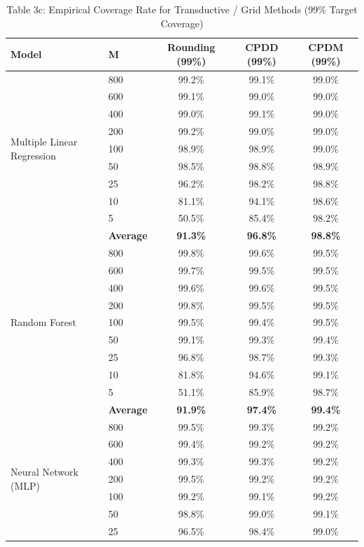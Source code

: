 \documentclass[11pt,a4paper]{article}
\begin{document}
\begin{table}[H]
\centering
\caption{Table 3c: Empirical Coverage Rate for Transductive / Grid Methods (99\% Target Coverage)}
\label{tab:3c}
\scriptsize
\begin{tabular}{llccc}
\toprule
Model & M & Rounding (99\%) & CPDD (99\%) & CPDM (99\%) \\
\midrule
\multirow{9}{*}{Multiple Linear Regression}
 & 800 & 99.2\% & 99.1\% & 99.0\% \\
 & 600 & 99.1\% & 99.0\% & 99.0\% \\
 & 400 & 99.0\% & 99.1\% & 99.0\% \\
 & 200 & 99.2\% & 99.0\% & 99.0\% \\
 & 100 & 98.9\% & 98.9\% & 99.0\% \\
 & 50  & 98.5\% & 98.8\% & 98.9\% \\
 & 25  & 96.2\% & 98.2\% & 98.8\% \\
 & 10  & 81.1\% & 94.1\% & 98.6\% \\
 & 5   & 50.5\% & 85.4\% & 98.2\% \\
 & \textbf{Average} & \textbf{91.3\%} & \textbf{96.8\%} & \textbf{98.8\%} \\
\midrule
\multirow{9}{*}{Random Forest}
 & 800 & 99.8\% & 99.6\% & 99.5\% \\
 & 600 & 99.7\% & 99.5\% & 99.5\% \\
 & 400 & 99.6\% & 99.6\% & 99.5\% \\
 & 200 & 99.8\% & 99.5\% & 99.5\% \\
 & 100 & 99.5\% & 99.4\% & 99.5\% \\
 & 50  & 99.1\% & 99.3\% & 99.4\% \\
 & 25  & 96.8\% & 98.7\% & 99.3\% \\
 & 10  & 81.8\% & 94.6\% & 99.1\% \\
 & 5   & 51.1\% & 85.9\% & 98.7\% \\
 & \textbf{Average} & \textbf{91.9\%} & \textbf{97.4\%} & \textbf{99.4\%} \\
\midrule
\multirow{9}{*}{Neural Network (MLP)}
 & 800 & 99.5\% & 99.3\% & 99.2\% \\
 & 600 & 99.4\% & 99.2\% & 99.2\% \\
 & 400 & 99.3\% & 99.3\% & 99.2\% \\
 & 200 & 99.5\% & 99.2\% & 99.2\% \\
 & 100 & 99.2\% & 99.1\% & 99.2\% \\
 & 50  & 98.8\% & 99.0\% & 99.1\% \\
 & 25  & 96.5\% & 98.4\% & 99.0\% \\

\end{tabular}
\end{table}
\end{document}
